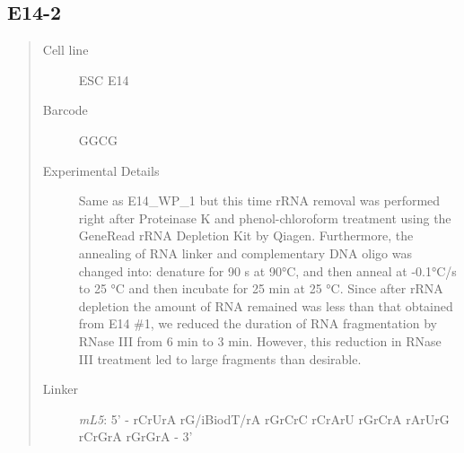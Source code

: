 \documentclass[letterpaper,10pt,english]{sphinxmanual}
\begin{document}
\subsection{E14-2}
\label{Data_Resources:e14-2}\begin{quote}\begin{description}
\item[{Cell line}] \leavevmode
ESC E14

\item[{Barcode}] \leavevmode
GGCG

\item[{Experimental Details}] \leavevmode
Same as E14\_WP\_1 but this time rRNA removal was performed right after
Proteinase K and phenol-chloroform treatment using the GeneRead rRNA Depletion Kit by
Qiagen. Furthermore, the annealing of RNA linker and complementary DNA oligo was changed
into: denature for 90 s at 90°C, and then anneal at -0.1°C/s to 25 °C and then incubate
for 25 min at 25 °C. Since after rRNA depletion the amount of RNA remained was less than
that obtained from E14 \#1, we reduced the duration of RNA fragmentation by RNase III from
6 min to 3 min. However, this reduction in RNase III treatment led to large fragments than
desirable.

\item[{Linker}] \leavevmode
\emph{mL5}: 5' - rCrUrA rG/iBiodT/rA rGrCrC rCrArU rGrCrA rArUrG rCrGrA rGrGrA - 3'

\end{description}\end{quote}
\end{document}

